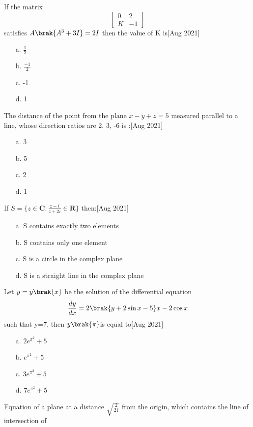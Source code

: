 \item If the matrix $$\begin{bmatrix}
    0&2\\K&-1
\end{bmatrix}$$ satisfies $A\brak{A^3+3I} = 2I$ then the value of K is\hfill  [Aug 2021]
\begin{enumerate}
    \item [a.] $\frac{1}{2}$
    \item [b.] $\frac{-1}{2}$
    \item [c.] -1
    \item [d.] 1
\end{enumerate}
\item The distance of the point  from the plane $x - y + z = 5$ measured parallel to a line, whose
direction ratios are 2, 3, -6 is :\hfill  [Aug 2021]
\begin{enumerate}
\item [a.] 3
    \item [b.] 5
    \item [c.] 2
    \item [d.] 1
\end{enumerate}
\item If $S = \{z\in\mathbf{C}:\frac{z-i}{z+2i}\in \mathbf{R}\}$ then:\hfill  [Aug 2021]
\begin{enumerate}
 \item [a.]  S contains exactly two elements
    \item [b.]  S contains only one element
    \item [c.]  S is a circle in the complex plane
    \item [d.]  S is a straight line in the complex plane
\end{enumerate}
\item Let $y=y\brak{x}$ be the solution of the differential equation $$\frac{dy}{dx}=2\brak{y+2\sin x-5}x-2\cos{x}$$ such that y=7, then $y\brak{\pi}$is equal to\hfill  [Aug 2021]
\begin{enumerate}
    \item [a.] $2e^{\pi ^2}+5$
    \item [b.] $e^{\pi ^2}+5$
    \item [c.] $3e^{\pi ^2}+5$
    \item [d.] $7e^{\pi ^2}+5$
\end{enumerate}
\item Equation of a plane at a distance $\sqrt{\frac{2}{21}}$ from the
origin, which contains the line of intersection of
